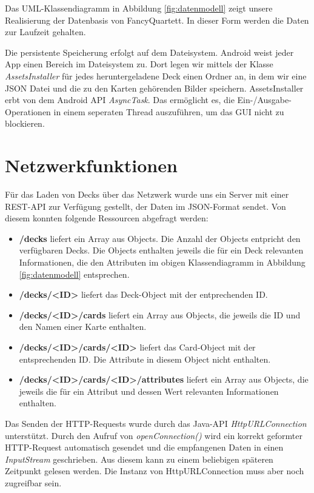 Das UML-Klassendiagramm in Abbildung \ref{fig:datenmodell} zeigt unsere Realisierung der Datenbasis von FancyQuartett. In dieser Form werden die Daten zur Laufzeit gehalten.

Die persistente Speicherung erfolgt auf dem Dateisystem. Android weist jeder App einen Bereich im Dateisystem zu. Dort legen wir mittels der Klasse \emph{AssetsInstaller} für jedes heruntergeladene Deck einen Ordner an, in dem wir eine JSON Datei und die zu den Karten gehörenden Bilder speichern. AssetsInstaller erbt von dem Android API \emph{AsyncTask}. Das ermöglicht es, die Ein-/Ausgabe-Operationen in einem seperaten Thread auszuführen, um das GUI nicht zu blockieren.

\section{Netzwerkfunktionen}
\label{sec:netzwerkfunktionen}

Für das Laden von Decks über das Netzwerk wurde uns ein Server mit einer REST-API zur Verfügung gestellt, der Daten im JSON-Format sendet. Von diesem konnten folgende Ressourcen abgefragt werden:
\begin{itemize}
    \item \textbf{/decks} liefert ein Array aus Objects. Die Anzahl der Objects entpricht den verfügbaren Decks. Die Objects enthalten jeweils die für ein Deck relevanten Informationen, die den Attributen im obigen Klassendiagramm in Abbildung \ref{fig:datenmodell} entsprechen.
    \item \textbf{/decks/<ID>} liefert das Deck-Object mit der entprechenden ID.
    \item \textbf{/decks/<ID>/cards} liefert ein Array aus Objects, die jeweils die ID und den Namen einer Karte enthalten.
    \item \textbf{/decks/<ID>/cards/<ID>} liefert das Card-Object mit der entsprechenden ID. Die Attribute in diesem Object nicht enthalten.
    \item \textbf{/decks/<ID>/cards/<ID>/attributes} liefert ein Array aus Objects, die jeweils die für ein Attribut und dessen Wert relevanten Informationen enthalten.
\end{itemize}

Das Senden der HTTP-Requests wurde durch das Java-API \emph{HttpURLConnection} unterstützt. Durch den Aufruf von \emph{openConnection()} wird ein korrekt geformter HTTP-Request automatisch gesendet und die empfangenen Daten in einen \emph{InputStream} geschrieben. Aus diesem kann zu einem beliebigen späteren Zeitpunkt gelesen werden. Die Instanz von HttpURLConnection muss aber noch zugreifbar sein.

